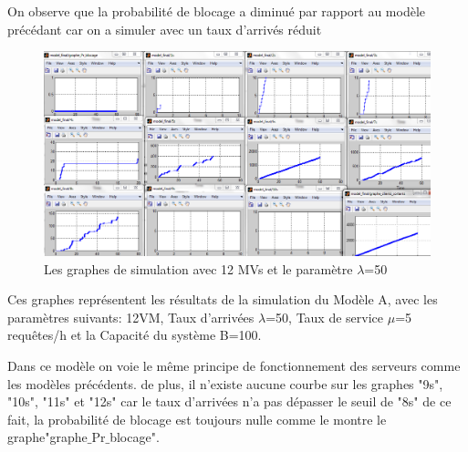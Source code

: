 \noindent On observe que la probabilité de blocage a diminué par rapport au modèle précédant car on a simuler avec un taux d'arrivés  réduit
 \newpage
 \begin{figure}[ht!]
\centering
\includegraphics[width=0.95 \textwidth]{photo/graphe_12MV.png}
\caption{Les graphes de simulation avec 12 MVs et le paramètre $\lambda$=50}
\label{fig:graphe3}
\end{figure}
\noindent Ces graphes représentent les résultats de la simulation du Modèle A, avec les paramètres suivants: 12VM, Taux d’arrivées  $\lambda$=50, Taux de service  $\mu$=5 requêtes/h et la Capacité du système B=100.

Dans ce modèle on voie le même principe de fonctionnement des serveurs comme les modèles précédents. de plus, il n'existe aucune courbe sur les graphes "9s", "10s", "11s" et "12s" car le taux d'arrivées n'a pas dépasser le seuil de "8s" de ce fait, la probabilité de blocage est toujours nulle comme le montre le graphe"graphe$\_$Pr$\_$blocage".


 



